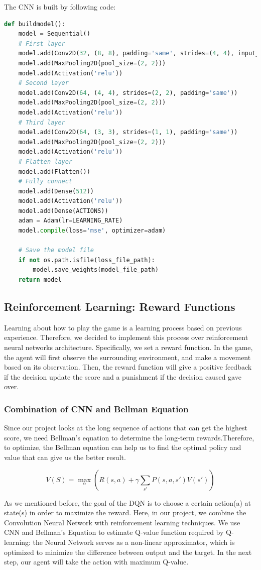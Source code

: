 \documentclass{article}
\begin{document}
The CNN is built by following code:
\begin{lstlisting}[language=Python]
def buildmodel():
    model = Sequential()
    # First layer
    model.add(Conv2D(32, (8, 8), padding='same', strides=(4, 4), input_shape=(img_cols, img_rows, img_channels)))
    model.add(MaxPooling2D(pool_size=(2, 2)))
    model.add(Activation('relu'))
    # Second layer
    model.add(Conv2D(64, (4, 4), strides=(2, 2), padding='same'))
    model.add(MaxPooling2D(pool_size=(2, 2)))
    model.add(Activation('relu'))
    # Third layer
    model.add(Conv2D(64, (3, 3), strides=(1, 1), padding='same'))
    model.add(MaxPooling2D(pool_size=(2, 2)))
    model.add(Activation('relu'))
    # Flatten layer
    model.add(Flatten())
    # Fully connect
    model.add(Dense(512))
    model.add(Activation('relu'))
    model.add(Dense(ACTIONS))
    adam = Adam(lr=LEARNING_RATE)
    model.compile(loss='mse', optimizer=adam)

    # Save the model file
    if not os.path.isfile(loss_file_path):
        model.save_weights(model_file_path)
    return model
\end{lstlisting}

\subsection{Reinforcement Learning: Reward Functions}
Learning about how to play the game is a learning process based on previous experience. Therefore, we decided to implement this process over reinforcement neural networks architecture. Specifically, we set a reward function. In the game, the agent will first observe the surrounding environment, and make a movement based on its observation. Then, the reward function will give a positive feedback if the decision update the score and a punishment if the decision caused gave over. 

\subsubsection{Combination of CNN and Bellman Equation}
Since our project looks at the long sequence of actions that can get the highest score, we need Bellman's equation to determine the long-term rewards.Therefore, to optimize, the Bellman equation can help us to find the optimal policy and value that can give us the better result.

$$V(S) = \max_{\alpha}(R(s, a) + \gamma\sum_{s'} P(s,a,s')V(s'))$$

As we mentioned before, the goal of the DQN is to choose a certain action(a) at state(s) in order to maximize the reward. Here, in our project, we combine the Convolution Neural Network with reinforcement learning techniques. We use CNN and Bellman’s Equation to estimate Q-value function required by Q-learning: the Neural Network serves as a non-linear approximator, which is optimized to minimize the difference between output and the target. In the next step, our agent will take the action with maximum Q-value.
\end{document}

